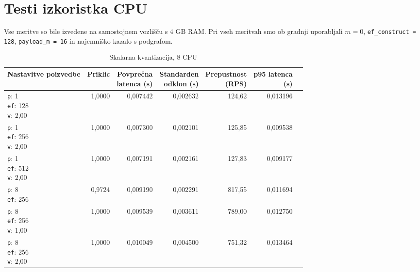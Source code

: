 \clearpage

\section{Testi izkoristka CPU}

Vse meritve so bile izvedene na samostojnem vozlišču s 4 GB RAM. Pri vseh meritvah smo ob gradnji uporabljali $m = 0$, \texttt{ef\_construct = 128}, \texttt{payload\_m = 16} in najemniško kazalo s podgrafom.


\begin{table}[htbp]
  \centering
\small
  \caption{Skalarna kvantizacija, 8 CPU}
  \label{tab:single-8cpu-4ram:sq:qdrant-dipl-baseline-tenant-subgraph-sq-ext-m16-ef-128-random-768-100-tenants-extended-upload-2026-08-20-00-00-10.json}
  \begin{tabularx}{\textwidth}{Xrrrrrr}
    \toprule
    Nastavitve poizvedbe & Priklic & \makecell{Povprečna\\latenca (s)} & \makecell{Standarden\\odklon (s)} & \makecell{Prepustnost\\(RPS)} & \makecell{p95 latenca\\(s)}  \\
    \midrule
    \makecell{\texttt{p}: 1\\\texttt{ef}: 128\\\texttt{v}: 2,00} & 1,0000 & 0,007442 & 0,002632 & 124,62 & 0,013196 \\
    \makecell{\texttt{p}: 1\\\texttt{ef}: 256\\\texttt{v}: 2,00} & 1,0000 & 0,007300 & 0,002101 & 125,85 & 0,009538 \\
    \makecell{\texttt{p}: 1\\\texttt{ef}: 512\\\texttt{v}: 2,00} & 1,0000 & 0,007191 & 0,002161 & 127,83 & 0,009177 \\
    \makecell{\texttt{p}: 8\\\texttt{ef}: 256} & 0,9724 & 0,009190 & 0,002291 & 817,55 & 0,011694 \\
    \makecell{\texttt{p}: 8\\\texttt{ef}: 256\\\texttt{v}: 1,00} & 1,0000 & 0,009539 & 0,003611 & 789,00 & 0,012750 \\
    \makecell{\texttt{p}: 8\\\texttt{ef}: 256\\\texttt{v}: 2,00} & 1,0000 & 0,010049 & 0,004500 & 751,32 & 0,013464 \\

\end{tabularx}
\end{table}
